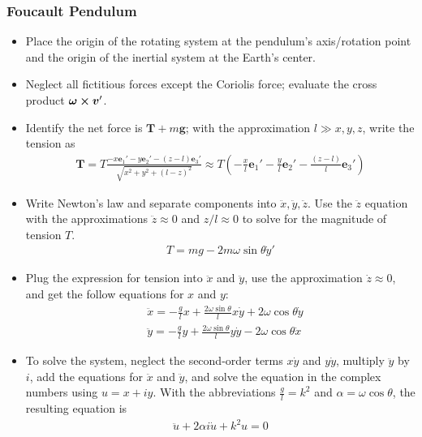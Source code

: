 \documentclass[11pt, a4paper]{article}
\newcommand{\e}{\mathbf{e}} %
\begin{document}
\subsubsection{Foucault Pendulum}
\begin{itemize}
	\item Place the origin of the rotating system at the pendulum's axis/rotation point and the origin of the inertial system at the Earth's center.
	
	\item Neglect all fictitious forces except the Coriolis force; evaluate the cross product $ \bm{\omega} \cross \bm{v}' $.
	
	\item Identify the net force is $ \bm{T} + m\bm{g} $; with the approximation $ l \gg x, y, z $, write the tension as
	\begin{align*}
		\bm{T} = T\frac{-x\e_1' - y\e_2' - (z-l)\e_3'}{\sqrt{x^2 + y^2 + (l-z)^2}} \approx T\left (-\frac{x}{l}\e_1' - \frac{y}{l}\e_2' - \frac{(z-l)}{l}\e_3'\right )
	\end{align*}
	
	\item Write Newton's law and separate components into $ \ddot{x}, \ddot{y}, \ddot{z} $. Use the $ \ddot{z} $ equation with the approximations $ \ddot{z} \approx 0 $ and $ z/l \approx 0 $ to solve for the magnitude of tension $ T $.
	\begin{align*}	
		T = mg - 2m\omega \sin \theta \dot{y}'
	\end{align*}
	
	\item Plug the expression for tension into $ \ddot{x} $ and $ \ddot{y} $, use the approximation $ \dot{z} \approx 0 $, and get the follow equations for $ x $ and $ y $:
	\begin{align*}
		&\ddot{x} = -\frac{g}{l} x + \frac{2 \omega \sin \theta }{l}x \dot y + 2 \omega \cos \theta \dot y\\
		&\ddot{y} = -\frac{g}{l} y + \frac{2 \omega \sin \theta }{l}y \dot y - 2 \omega \cos \theta \dot x
	\end{align*}
	
	\item To solve the system, neglect the second-order terms $ x \dot{y} $ and $ y \dot{y}$, multiply $ \ddot y $ by $ i $, add the equations for $ \ddot{x} $ and $ \ddot{y} $, and solve the equation in the complex numbers using $ u = x + iy $. With the abbreviations $ \frac{g}{l} = k^2$ and $ \alpha = \omega \cos \theta $, the resulting equation is
	\begin{align*}
		\ddot u + 2 \alpha i \dot u + k^2 u = 0
	\end{align*}
	

\end{itemize}
\end{document}
